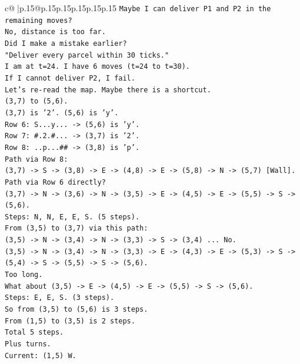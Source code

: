 \documentclass{article}
\begin{document}
{\begin{supertabular}{c@{$\;$}|p{.15\linewidth}@{}p{.15\linewidth}p{.15\linewidth}p{.15\linewidth}p{.15\linewidth}p{.15\linewidth}}
{{{\texttt{Maybe I can deliver P1 and P2 in the remaining moves?} \\
\texttt{No, distance is too far.} \\
\texttt{Did I make a mistake earlier?} \\
\texttt{"Deliver every parcel within 30 ticks."} \\
\texttt{I am at t=24. I have 6 moves (t=24 to t=30).} \\
\texttt{If I cannot deliver P2, I fail.} \\
\texttt{Let's re{-}read the map. Maybe there is a shortcut.} \\
\texttt{(3,7) to (5,6).} \\
\texttt{(3,7) is '2'. (5,6) is 'y'.} \\
\texttt{Row 6: S...y... {-}> (5,6) is 'y'.} \\
\texttt{Row 7: \#.2.\#... {-}> (3,7) is '2'.} \\
\texttt{Row 8: ..p...\#\# {-}> (3,8) is 'p'.} \\
\texttt{Path via Row 8:} \\
\texttt{(3,7) {-}> S {-}> (3,8) {-}> E {-}> (4,8) {-}> E {-}> (5,8) {-}> N {-}> (5,7) {[}Wall{]}.} \\
\texttt{Path via Row 6 directly?} \\
\texttt{(3,7) {-}> N {-}> (3,6) {-}> N {-}> (3,5) {-}> E {-}> (4,5) {-}> E {-}> (5,5) {-}> S {-}> (5,6).} \\
\texttt{Steps: N, N, E, E, S. (5 steps).} \\
\texttt{From (3,5) to (3,7) via this path:} \\
\texttt{(3,5) {-}> N {-}> (3,4) {-}> N {-}> (3,3) {-}> S {-}> (3,4) ... No.} \\
\texttt{(3,5) {-}> N {-}> (3,4) {-}> N {-}> (3,3) {-}> E {-}> (4,3) {-}> E {-}> (5,3) {-}> S {-}> (5,4) {-}> S {-}> (5,5) {-}> S {-}> (5,6).} \\
\texttt{Too long.} \\
\texttt{What about (3,5) {-}> E {-}> (4,5) {-}> E {-}> (5,5) {-}> S {-}> (5,6).} \\
\texttt{Steps: E, E, S. (3 steps).} \\
\texttt{So from (3,5) to (5,6) is 3 steps.} \\
\texttt{From (1,5) to (3,5) is 2 steps.} \\
\texttt{Total 5 steps.} \\
\texttt{Plus turns.} \\
\texttt{Current: (1,5) W.} \\
}}}
\end{supertabular}}
\end{document}
